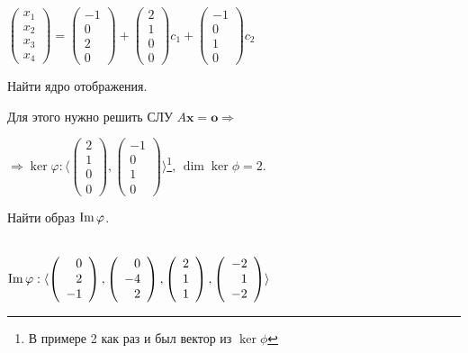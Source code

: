 $\left( \begin{array}{r}
x_1\\
x_2\\
x_3\\
x_4
\end{array}\right) = \left( \begin{array}{r}
-1\\
0\\
2\\
0
\end{array}\right) + \left( \begin{array}{r}
2\\
1\\
0\\
0
\end{array}\right) c_1 + \left( \begin{array}{r}
-1\\
0\\
1\\
0
\end{array}\right) c_2 $

\begin{prim}
	Найти ядро отображения.
\end{prim}

Для этого нужно решить СЛУ $A\textbf{x}=\textbf{o} \Rightarrow$

$\Rightarrow\ker\varphi:\langle \left( \begin{array}{r} %
2\\
1\\
0\\
0
\end{array}\right), \left( \begin{array}{r}
-1\\
0\\
1\\
0
\end{array}\right)\rangle$\footnote{В примере 2 как раз и был вектор из $\ker\phi$}, \quad $\dim\ker\phi=2$.

\begin{prim}
	Найти образ $\operatorname{\mathop{Im}}\varphi$.
\end{prim}\\

$\operatorname{\mathop{Im}}\varphi : \langle \left( \begin{array}{r}
0\\
2\\
-1
\end{array}\right),\left( \begin{array}{r}
0\\
-4\\
2
\end{array}\right),\left( \begin{array}{r}
2\\
1\\
1
\end{array}\right),\left( \begin{array}{r}
-2\\
1\\
-2
\end{array}\right) \rangle$

